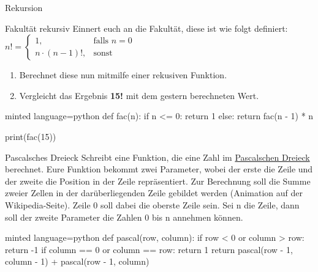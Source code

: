 \begin{task}[points=auto]{Rekursion}
    \begin{subtask*}[points=0]{Fakultät rekursiv }
        Einnert euch an die Fakultät, diese ist wie folgt definiert:
        $n! =\left\{\begin{array}{cl} 1, & \mbox{falls }  n = 0 \\ n \cdot(n-1)!, & \mbox{sonst} \end{array}\right.$
        \begin{enumerate}
            \item Berechnet diese nun mitmilfe einer rekusiven Funktion.
            \item Vergleicht das Ergebnis \textbf{15!} mit dem gestern berechneten Wert.
        \end{enumerate}

        \begin{solution}
            \begin{codeBlock}[]{minted language=python}
                def fac(n):
                    if n <= 0:
                        return 1
                    else:
                        return fac(n - 1) * n


                print(fac(15))
            \end{codeBlock}
        \end{solution}
    \end{subtask*}
    \begin{subtask*}[points=0]{Pascalsches Dreieck }
        Schreibt eine Funktion, die eine Zahl im \href{https://de.wikipedia.org/wiki/Pascalsches_Dreieck}{Pascalschen Dreieck}
        berechnet. Eure Funktion bekommt zwei Parameter, wobei der erste die Zeile und
        der zweite die Position in der Zeile repräsentiert. Zur Berechnung soll die
        Summe zweier Zellen in der darüberliegenden Zeile gebildet werden (Animation
        auf der Wikipedia-Seite). Zeile 0 soll dabei die oberste Zeile sein. Sei n die
        Zeile, dann soll der zweite Parameter die Zahlen 0 bis n annehmen können.

        \begin{solution}
            \begin{codeBlock}[]{minted language=python}
                def pascal(row, column):
                    if row < 0 or column > row:
                        return -1
                    if column == 0 or column == row:
                        return 1
                    return pascal(row - 1, column - 1) + pascal(row - 1, column)



\end{codeBlock}
\end{solution}
\end{subtask*}
\end{task}

